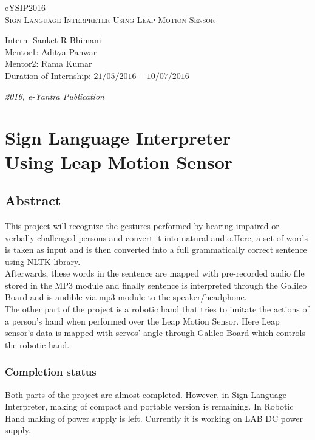 \documentclass[a4paper,12pt,oneside]{book}
\begin{document}
\begin{titlepage}
\raggedright
{\Large eYSIP2016\\[1cm]}
{\Huge\scshape Sign Language Interpreter Using Leap Motion Sensor \\[.1in]}
\vfill
\begin{flushright}
{\large Intern: Sanket R Bhimani \\}
{\large Mentor1: Aditya Panwar\\}
{\large Mentor2: Rama Kumar \\}
{\large Duration of Internship: $ 21/05/2016-10/07/2016 $ \\}
\end{flushright}

{\itshape 2016, e-Yantra Publication}
\end{titlepage}

\chapter[Project Tag]{Sign Language Interpreter\\Using Leap Motion Sensor}
\section*{Abstract}
This project will recognize the gestures performed by hearing impaired or verbally challenged persons and convert it into natural audio.Here, a set of words is taken as input and is then converted into a full grammatically correct sentence using NLTK library.\\
Afterwards, these words in the sentence are mapped with pre-recorded audio file stored in the MP3 module and finally sentence is interpreted through the Galileo Board and is audible via mp3 module to the speaker/headphone.\\
The other part of the project is a robotic hand that tries to imitate the actions of a person's hand when performed over the Leap Motion Sensor. Here Leap sensor's data is mapped with servos' angle through Galileo Board which controls the robotic hand.

\subsection*{Completion status}
Both parts of the project are almost completed. However, in Sign Language Interpreter, making of compact and portable version is remaining. In Robotic Hand making of power supply is left. Currently it is working on LAB DC power supply.
\end{document}
